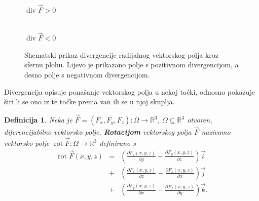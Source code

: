 \documentclass[12pt,a4paper]{article}
\newtheorem{deff}[tm]{Definicija}
\begin{document}
\begin{figure}[H]
\begin{minipage}[b]{0.48\textwidth}
  \centering
  \\[2pt]
  {\small $\operatorname{div} \overrightarrow{F}>0$}
\end{minipage}
\hfill
\begin{minipage}[b]{0.48\textwidth}
  \centering
  \\[2pt]
  {\small  $\operatorname{div} \overrightarrow{F}<0$}
\end{minipage}

\caption{Shematski prikaz divergencije radijalnog vektorskog polja kroz sfernu plohu. Lijevo je prikazano polje s pozitivnom divergencijom, a desno polje s negativnom divergencijom.}
\end{figure}


Divergencija opisuje ponašanje vektorskog polja u nekoj točki, odnosno
pokazuje širi li se ono iz te točke prema van ili se u njoj skuplja.


\begin{deff}
Neka je
$\overrightarrow{F}=(F_x,F_y,F_z):\Omega\to\mathbb{R}^3$, $\Omega \subseteq \mathbb{R}^3$ otvoren,
diferencijabilno vektorsko polje.
\textbf{\textit{Rotacijom}} vektorskog polja $\overrightarrow{F}$ nazivamo vektorsko polje
$\operatorname{rot}\overrightarrow{F}:\Omega\to\mathbb{R}^3$ definirano s
$$
\begin{array}{ccc}
    \operatorname{rot}\overrightarrow{F}(x,y,z)
&=&\displaystyle
\left(
\frac{\partial F_z(x,y,z)}{\partial y}
-
\frac{\partial F_y(x,y,z)}{\partial z}
\right)\overrightarrow{i}
\\
&+&\displaystyle
\left(
\frac{\partial F_x(x,y,z)}{\partial z}
-
\frac{\partial F_z(x,y,z)}{\partial x}
\right)\overrightarrow{j}
\\
&+&\displaystyle
\left(
\frac{\partial F_y(x,y,z)}{\partial x}
-
\frac{\partial F_x(x,y,z)}{\partial y}
\right)\overrightarrow{k}.
\end{array}
$$
\end{deff}
\end{document}
